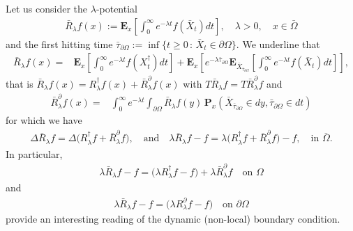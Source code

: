 \documentclass[11pt,a4paper]{article}
\begin{document}
Let us consider the $\lambda$-potential
\begin{align*}
\bar{R}_\lambda f(x) := \mathbf{E}_x \left[ \int_0^\infty e^{-\lambda t}f(\bar{X}_t) dt \right], \quad \lambda>0, \quad x \in \bar{\Omega}
\end{align*}
and the first hitting time $\bar{\tau}_{\partial \Omega} := \inf\{t \geq 0\,:\, \bar{X}_t \in \partial \Omega\}$. We underline that
\begin{align*}
\bar{R}_\lambda f(x) 
= & \mathbf{E}_x \left[ \int_0^\infty e^{-\lambda t}f(X^\dagger_t) dt \right] + \mathbf{E}_x \left[ e^{-\lambda \bar{\tau}_{\partial \Omega}} \mathbf{E}_{\bar{X}_{\bar{\tau}_{\partial \Omega}}} \left[ \int_0^\infty e^{-\lambda t} f(\bar{X}_t) dt \right] \right],
\end{align*}
that is $\bar{R}_\lambda f(x) = R^\dagger_\lambda f(x) + \bar{R}^\partial_\lambda f(x)$ with $T \bar{R}_\lambda f = T \bar{R}_\lambda^\partial f$ and 
\begin{align*}
\bar{R}_\lambda^\partial f(x)  
= & \int_0^\infty  e^{-\lambda t}  \int_{\partial \Omega} \bar{R}_\lambda f(y) \, \mathbf{P}_x(\bar{X}_{\bar{\tau}_{\partial \Omega}} \in dy, \bar{\tau}_{\partial \Omega} \in dt)
\end{align*}
for which we have
\begin{align*}
\Delta \bar{R}_\lambda f = \Delta \big( R^\dagger_\lambda f + \bar{R}^\partial_\lambda f \big), \quad \textrm{and} \quad \lambda \bar{R}_\lambda f - f = \lambda \big( R^\dagger_\lambda f + \bar{R}^\partial_\lambda f \big) - f, \quad \textrm{in } \bar{\Omega}.
\end{align*}
In particular,
\begin{align}
\lambda \bar{R}_\lambda f - f = \big( \lambda  R^\dagger_\lambda f -f \big) + \lambda \bar{R}^\partial_\lambda f \quad \textrm{on } \Omega
\end{align}
and
\begin{align}
\lambda \bar{R}_\lambda f - f = \big( \lambda  R^\partial_\lambda f -f \big) \quad \textrm{on } \partial \Omega
\end{align}
provide an interesting reading of the dynamic (non-local) boundary condition.\\
\end{document}
